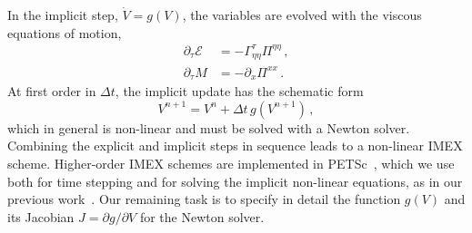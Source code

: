 \documentclass[12pt,aps,preprint,nofootinbib,noshowkeys,noshowpacs,longbibliography,superscriptaddress,tightenlines]{revtex4-2}
\def\edense{{\mathcal{E}}}
\def\pdense{M}
\def\st{\begin{equation}}
\def\stp{\end{equation}}
\def\tvisc{\Pi}
\begin{document}
In the implicit step, $\dot V = g(V)$, the variables are evolved
with the viscous equations of motion,
\begin{subequations}
\label{eq:gofV}
\begin{align}
  \partial_\tau \edense
  &= - \Gamma^{\tau}_{\eta\eta} \Pi^{\eta\eta} \, , \\
  \partial_\tau \pdense
  &= - \partial_x \tvisc^{xx} \, .
\end{align}
\end{subequations}
At first order in $\Delta t$, the implicit update has the
schematic form
\st
\label{eq:gofVschematic}
  V^{n+1} = V^n + \Delta t \, g(V^{n+1}) \, ,
\stp
which in general is non-linear and must be
solved with a Newton solver. Combining the explicit and
implicit steps in sequence leads to a non-linear IMEX scheme.
Higher-order IMEX schemes are implemented in
PETSc~\cite{petsc-web-page}, which we use both for time stepping and
for solving the implicit non-linear equations, as in our previous
work~\cite{NumericsPaper}. Our remaining task is to specify in detail the
function $g(V)$ and its Jacobian
$J = \partial g / \partial V$ for the Newton solver.
\end{document}

